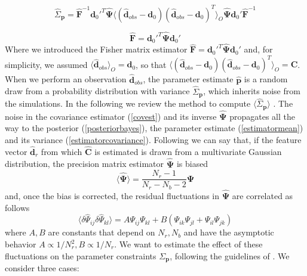 \documentclass[reprint,aps,prd,superscriptaddress,showkeys,showpacs]{revtex4-1}
\newcommand{\bb}[1]{\mathbf{#1}}
\newcommand{\bbh}[1]{\mathbf{\hat{#1}}}
\newcommand{\h}[1]{\hat{#1}}
\begin{document}
\begin{equation}
\label{estimatorcovariance}
\h{\Sigma}_\bb{p} = \bbh{F}^{-1}\bb{d}_0'^T\bbh{\Psi}\langle(\bbh{d}_{obs}-\bb{d}_0)(\bbh{d}_{obs}-\bb{d}_0)^T\rangle_O\bbh{\Psi}\bb{d}_0'\bbh{F}^{-1}
\end{equation}

\begin{equation}
\label{estimatorfisher}
\bbh{F} = \bb{d}_0'^T\bbh{\Psi}\bb{d}_0'
\end{equation}
%
Where we introduced the Fisher matrix estimator $\bbh{F} = \bb{d}_0'^T\bbh{\Psi}\bb{d}_0'$ and, for simplicity, we assumed $\langle\bbh{d}_{obs}\rangle_O=\bb{d}_0$, so that $\langle(\bbh{d}_{obs}-\bb{d}_0)(\bbh{d}_{obs}-\bb{d}_0)^T\rangle_O=\bb{C}$. 
When we perform an observation $\bbh{d}_{obs}$, the parameter estimate $\bbh{p}$ is a random draw from a probability distribution with variance $\h{\Sigma}_\bb{p}$, which inherits noise from the simulations. In the following we review the method to compute $\langle\h{\Sigma}_\bb{p}\rangle$ \citep{DodelsonSchneider13,Taylor12}. The noise in the covariance estimator (\ref{covest}) and its inverse $\bbh{\Psi}$ propagates all the way to the posterior (\ref{posteriorbayes}), the parameter estimate (\ref{estimatormean}) and its variance (\ref{estimatorcovariance}). Following \citep{Taylor12} we can say that, if the feature vector $\bbh{d}_r$ from which $\bbh{C}$ is estimated is drawn from a multivariate Gaussian distribution, the precision matrix estimator $\bbh{\Psi}$ is biased
\begin{equation}
\label{psibias}
\langle\bbh{\Psi}\rangle = \frac{N_r-1}{N_r-N_b-2}\bb{\Psi}
\end{equation}
%
and, once the bias is corrected, the residual fluctuations in $\bbh{\Psi}$ are correlated as follows
\begin{equation}
\label{psifluctuations}
\langle\delta\h{\Psi}_{ij}\delta\h{\Psi}_{kl}\rangle = A\Psi_{ij}\Psi_{kl} + B(\Psi_{ik}\Psi_{jl} + \Psi_{il}\Psi_{jk})
\end{equation}
%
where $A,B$ are constants that depend on $N_r,N_b$ and have the asymptotic behavior $A\propto1/N_r^2,B\propto1/N_r$. We want to estimate the effect of these fluctuations on the parameter constraints $\Sigma_\bb{p}$, following the guidelines of \citep{DodelsonSchneider13}. We consider three cases:
\end{document}
